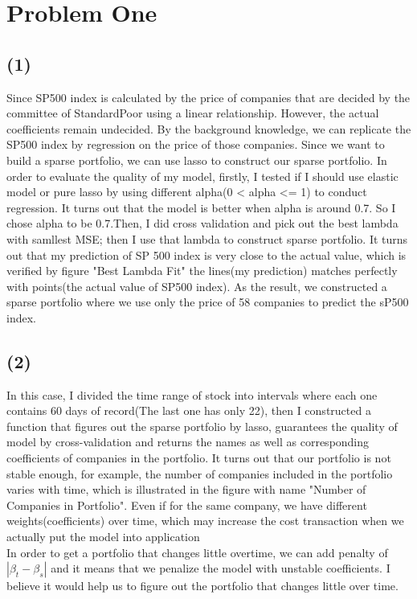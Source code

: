 \documentclass{article}\usepackage[]{graphicx}\usepackage[]{color}
\begin{document}
\section*{Problem One}
\subsection*{(1)}
Since SP500 index is calculated by the price of companies that are decided by the committee of StandardPoor using a linear relationship. However, the actual coefficients remain undecided. By the background knowledge, we can replicate the SP500 index by regression on the price of those companies. Since we want to build a sparse portfolio, we can use lasso to construct our sparse portfolio. In order to evaluate the quality of my model, firstly, I tested if I should use elastic model or pure lasso by using different alpha(0 < alpha <= 1) to conduct regression. It turns out that the model is better when alpha is around 0.7. So I chose alpha to be 0.7.Then, I did cross validation and pick out the best lambda with samllest MSE; then I use that lambda to construct sparse portfolio. It turns out that my prediction of SP 500 index is very close to the actual value, which is verified by figure "Best Lambda Fit" the lines(my prediction) matches perfectly with points(the actual value of SP500 index). As the result, we constructed a sparse portfolio where we use only the price of 58 companies to predict the sP500 index.

\subsection*{(2)}
In this case, I divided the time range of stock into intervals where each one contains 60 days of record(The last one has only 22), then I constructed a function that figures out the sparse portfolio by lasso, guarantees the quality of model by cross-validation and returns the names as well as corresponding coefficients of companies in the portfolio. It turns out that our portfolio is not stable enough, for example, the number of companies included in the portfolio varies with time, which is illustrated in the figure with name "Number of Companies in Portfolio". Even if for the same company, we have different weights(coefficients) over time, which may increase the cost transaction when we actually put the model into application\\
In order to get a portfolio that changes little overtime, we can add penalty of $|\beta_t - \beta_s|$ and it means that we penalize the model with unstable coefficients. I believe it would help us to figure out the portfolio that changes little over time.
\end{document}
